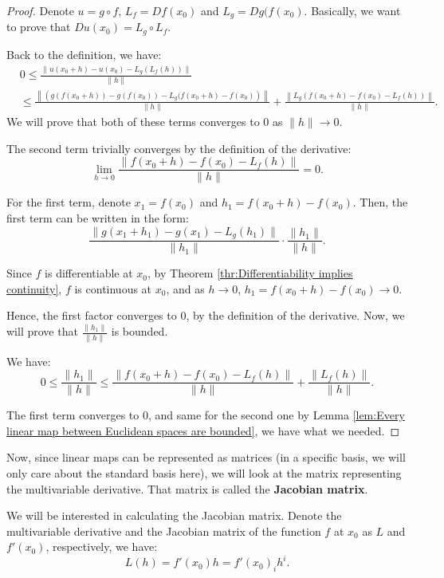 \begin{proof}
  Denote \( u = g \circ f \), \( L_{f} = Df(x_{0}) \) and \( L_{g} = Dg(f(x_{0})
  \). Basically, we want to prove that \( Du(x_{0}) = L_{g} \circ  L_{f} \).

  Back to the definition, we have:
  \begin{align*}
    &0 \le  \frac{\|u(x_{0} + h) - u(x_{0}) - L_{g}(L_{f}(h))\|}{\|h\|}\\
    &\le  \frac{\left\| \left( g(f(x_{0} + h)) - g(f(x_{0})) -
    L_{g}(f(x_{0} + h) - f(x_{0})\right)  \right\| }{\|h\|} +
    \frac{\left\| L_{g}\left( f(x_{0} + h) - f(x_{0}) -
        L_{f}(h)
    \right)  \right\| }{\|h\|}
  .\end{align*}
  We will prove that both of these terms converges to \( 0 \) as \( \|h\| \to 0
  \).

  The second term trivially converges by the definition of the derivative:
  \[
    \lim_{h \to  0} \frac{\|f(x_{0} + h) - f(x_{0}) - L_{f}(h)\|}{\|h\|} = 0
  .\] 

  For the first term, denote \( x_{1} = f(x_{0}) \) and \( h_{1} = f(x_{0} + h)
  - f(x_{0})\). Then, the first term can be written in the form:
  \[
    \frac{\|g(x_{1} + h_{1}) - g(x_{1}) - L_{g}(h_{1})\|}{\|h_{1}\|} \cdot
    \frac{\|h_{1}\|}{\|h\|}
  .\]

  Since \( f \) is differentiable at \( x_{0} \), by Theorem
  \ref{thr:Differentiability implies continuity}, \( f \) is continuous at \( x_{0}
  \), and as \( h \to 0 \), \( h_{1} = f(x_{0} + h) - f(x_{0}) \to 0 \).

  Hence, the first factor converges to \( 0 \), by the definition of the
  derivative. Now, we will prove that \( \frac{\|h_{1}\|}{\|h\|} \) is bounded.

  We have:
  \[
    0 \le  \frac{\|h_{1}\|}{\|h\|} \le  \frac{\|f(x_{0}+h) - f(x_{0}) -
    L_{f}(h)\|}{\|h\|} + \frac{\|L_{f}(h)\|}{\|h\|}
  .\] 

  The first term converges to \( 0 \), and same for the second one by Lemma
  \ref{lem:Every linear map between Euclidean spaces are bounded}, we have what
  we needed.
\end{proof}

Now, since linear maps can be represented as matrices (in a specific basis, we
will only care about the standard basis here), we will look at the matrix
representing the multivariable derivative. That matrix is called the
\textbf{Jacobian matrix}.

We will be interested in calculating the Jacobian matrix. Denote the
multivariable derivative and the Jacobian
matrix of the function \( f \) at \( x_{0} \) as \( L \) and \(
f'(x_{0}) \), respectively, we have:
\[
  L(h) = f'(x_{0})h = f'(x_{0})_{i}h^{i}
.\] 

